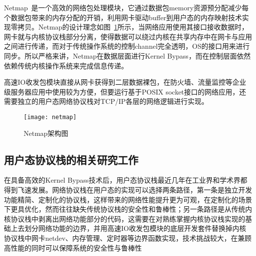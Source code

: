 Netmap~\cite{NetMap}是一个高效的网络包处理模块，它通过数据包memory资源预分配减少每个数据包带来的内存分配的开销，利用网卡驱动buffer到用户态的内存映射技术实现零拷贝。Netmap的设计理念如图~\ref{fig:netmap}所示，当网络应用使用其接口接收数据时，网卡就与内核协议栈部分分离，使得数据可以绕过内核在共享内存中在网卡与应用之间进行传递，而对于传统操作系统的控制channel完全透明，OS的接口用来进行同步。所以严格来讲，Netmap在数据层面进行Kernel Bypass，而在控制层面依然依赖传统内核操作系统来完成信息传递。

高速IO收发包模块直接从网卡获得到二层数据裸包，在防火墙、流量监控等企业级服务器应用中使用较为方便，但要运行基于POSIX socket接口的网络应用，还需要独立的用户态网络协议栈对TCP/IP各层的网络逻辑进行实现。

\vspace{-10pt}
\begin{figure}[H] %
  \centering
  \texttt{[image: netmap]}
  \caption{Netmap架构图}
  \label{fig:netmap}
\end{figure}
\vspace{-10pt}

\subsection{用户态协议栈的相关研究工作}
\label{subsec:02_userspace_related_work}

在具备高效的Kernel Bypass技术后，用户态协议栈最近几年在工业界和学术界都得到飞速发展。网络协议栈在用户态的实现可以选择两条路径，第一条是独立开发功能精简、定制化的协议栈，这样带来的网络性能提升更为可观，在定制化的场景下更具优化，然而往往缺失传统协议栈的安全性和鲁棒性；另一条路径是从传统内核协议栈中剥离出网络功能部分的代码，这需要在对熟练掌握内核协议栈实现的基础上去划分网络功能的边界，并用高速IO收发包模块的底层开发套件替换掉内核协议栈中网卡netdev、内存管理、定时器等边界函数实现，技术挑战较大，在兼顾高性能的同时可以保障系统的安全性与鲁棒性

